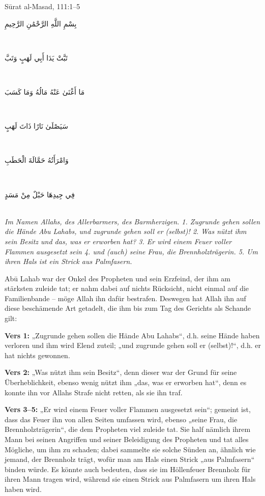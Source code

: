 \begin{quranvers}{Sūrat al-Masad, 111:1--5}
{\quranfont\begin{Arabic}
بِسْمِ اللَّهِ الرَّحْمَٰنِ الرَّحِيمِ
\end{Arabic}}\\[2mm]
{\quranfont\begin{Arabic}
تَبَّتْ يَدَا أَبِي لَهَبٍ وَتَبَّ
\end{Arabic}}\\[2mm]
{\quranfont\begin{Arabic}
مَا أَغْنَىٰ عَنْهُ مَالُهُ وَمَا كَسَبَ
\end{Arabic}}\\[2mm]
{\quranfont\begin{Arabic}
سَيَصْلَىٰ نَارًا ذَاتَ لَهَبٍ
\end{Arabic}}\\[2mm]
{\quranfont\begin{Arabic}
وَامْرَأَتُهُ حَمَّالَةَ الْحَطَبِ
\end{Arabic}}\\[2mm]
{\quranfont\begin{Arabic}
فِي جِيدِهَا حَبْلٌ مِنْ مَسَدٍ
\end{Arabic}}\\[3mm]
\emph{Im Namen Allahs, des Allerbarmers, des Barmherzigen. 1. Zugrunde gehen sollen die Hände
Abu Lahabs, und zugrunde gehen soll er (selbst)! 2. Was nützt ihm sein Besitz und das, was er
erworben hat? 3. Er wird einem Feuer voller Flammen ausgesetzt sein 4. und (auch) seine Frau,
die Brennholzträgerin. 5. Um ihren Hals ist ein Strick aus Palmfasern.}
\end{quranvers}

Abū Lahab war der Onkel des Propheten  und sein Erzfeind, der ihm am stärksten zuleide
tat; er nahm dabei auf nichts Rücksicht, nicht einmal auf die Familienbande – möge Allah ihn
dafür bestrafen. Deswegen hat Allah ihn auf diese beschämende Art getadelt, die ihm bis zum
Tag des Gerichts als Schande gilt:

\textbf{Vers 1:} „Zugrunde gehen sollen die Hände Abu Lahabs“, d.h. seine Hände haben verloren
und ihm wird Elend zuteil; „und zugrunde gehen soll er (selbst)!“, d.h. er hat nichts gewonnen.

\textbf{Vers 2:} „Was nützt ihm sein Besitz“, denn dieser war der Grund für seine Überheblichkeit,
ebenso wenig nützt ihm „das, was er erworben hat“, denn es konnte ihn vor Allahs Strafe nicht
retten, als sie ihn traf.

\textbf{Vers 3–5:} „Er wird einem Feuer voller Flammen ausgesetzt sein“; gemeint ist, dass das
Feuer ihn von allen Seiten umfassen wird, ebenso „seine Frau, die Brennholzträgerin“, die dem
Propheten  viel zuleide tat. Sie half nämlich ihrem Mann bei seinen Angriffen und seiner
Beleidigung des Propheten und tat alles Mögliche, um ihm zu schaden; dabei sammelte sie
solche Sünden an, ähnlich wie jemand, der Brennholz trägt, wofür man am Hals einen Strick
„aus Palmfasern“ binden würde. Es könnte auch bedeuten, dass sie im Höllenfeuer Brennholz für
ihren Mann tragen wird, während sie einen Strick aus Palmfasern um ihren Hals haben wird.

